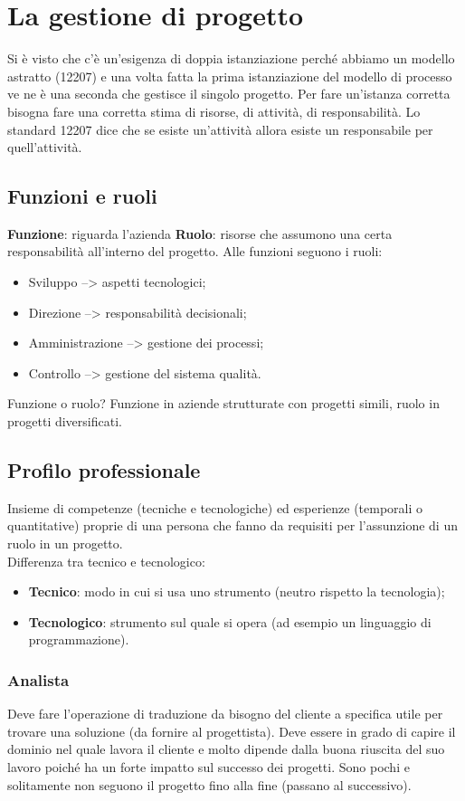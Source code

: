 \section{La gestione di progetto}
Si è visto che c'è un'esigenza di doppia istanziazione perché abbiamo un modello astratto (12207) e una volta fatta la prima istanziazione del modello di processo ve ne è una seconda che gestisce il singolo progetto. Per fare un'istanza corretta bisogna fare una corretta stima di risorse, di attività, di responsabilità. Lo standard 12207 dice che se esiste un'attività allora esiste un responsabile per quell'attività.
\subsection{Funzioni e ruoli}
\textbf{Funzione}: riguarda l'azienda
\textbf{Ruolo}: risorse che assumono una certa responsabilità all'interno del progetto.
Alle funzioni seguono i ruoli:
\begin{itemize}
\item Sviluppo --> aspetti tecnologici;
\item Direzione --> responsabilità decisionali; 
\item Amministrazione --> gestione dei processi;
\item Controllo --> gestione del sistema qualità.
\end{itemize}
Funzione o ruolo? Funzione in aziende strutturate con progetti simili, ruolo in progetti diversificati.

\subsection{Profilo professionale}
Insieme di competenze (tecniche e tecnologiche) ed esperienze (temporali o quantitative) proprie di una persona che fanno da requisiti per l'assunzione di un ruolo in un progetto.\\
Differenza tra tecnico e tecnologico:
\begin{itemize}
\item \textbf{Tecnico}: modo in cui si usa uno strumento (neutro rispetto la tecnologia);
\item \textbf{Tecnologico}: strumento sul quale si opera (ad esempio un linguaggio di programmazione).
\end{itemize}

\subsubsection{Analista}
Deve fare l'operazione di traduzione da bisogno del cliente a specifica utile per trovare una soluzione (da fornire al progettista). Deve essere in grado di capire il dominio nel quale lavora il cliente e molto dipende dalla buona riuscita del suo lavoro poiché ha un forte impatto sul successo dei progetti. Sono pochi e solitamente non seguono il progetto fino alla fine (passano al successivo). 


